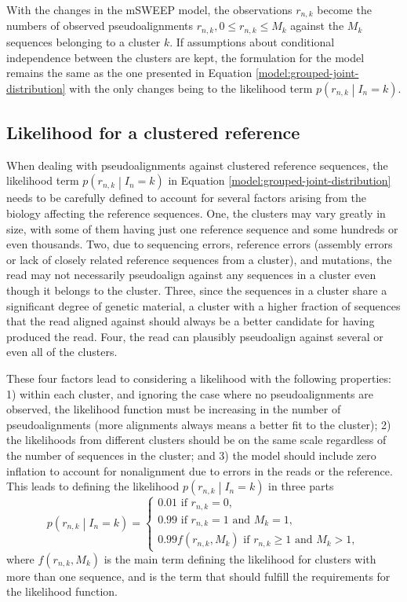\documentclass[officiallayout]{tktla}
\begin{document}
With the changes in the mSWEEP model, the observations $r_{n, k}$
become the numbers of observed pseudoalignments $r_{n, k}, 0 \leq
r_{n, k} \leq M_{k}$ against the $M_{k}$ sequences belonging to a
cluster $k$. If assumptions about conditional independence between the clusters
are kept, the formulation for the model remains the same as the one
presented in Equation \eqref{model:grouped-joint-distribution} with the
only changes being to the likelihood term $p\left(r_{n, k} \middle|
I_{n} = k\right)$.


\subsection{Likelihood for a clustered reference}

When dealing with pseudoalignments against clustered reference
sequences, the likelihood term $p\left(r_{n, k} \middle| I_{n} =
k\right)$ in Equation \eqref{model:grouped-joint-distribution} needs to
be carefully defined to account for several factors arising from the
biology affecting the reference sequences. One, the clusters may vary
greatly in size, with some of them having just one reference sequence
and some hundreds or even thousands. Two, due to sequencing errors,
reference errors (assembly errors or lack of closely related reference
sequences from a cluster), and mutations, the read may not necessarily
pseudoalign against any sequences in a cluster even though it belongs
to the cluster. Three, since the sequences in a cluster share a
significant degree of genetic material, a cluster with a higher
fraction of sequences that the read aligned against should always be a
better candidate for having produced the read. Four, the read can
plausibly pseudoalign against several or even all of the clusters.

These four factors lead to considering a likelihood with the following
properties: 1) within each cluster, and ignoring the case where no
pseudoalignments are observed, the likelihood function must be
increasing in the number of pseudoalignments (more alignments always
means a better fit to the cluster); 2) the likelihoods from different
clusters should be on the same scale regardless of the number of
sequences in the cluster; and 3) the model should include zero
inflation to account for nonalignment due to errors in the reads or
the reference. This leads to defining the likelihood $p\left(r_{n,
  k} \middle| I_{n} = k\right)$ in three parts
\begin{equation}
  \label{likelihood:without-normalization}
  p\left(r_{n, k} \middle| I_{n} = k\right) =
  \begin{cases}
    0.01\text{ if } r_{n, k} = 0, \\
    0.99\text{ if } r_{n, k} = 1 \text{ and } M_{k} = 1, \\
    0.99f\left(r_{n, k}, M_{k}\right)\text{ if } r_{n, k} \geq 1\text{ and } M_{k} > 1,
  \end{cases}
\end{equation}
where $f\left(r_{n, k}, M_{k}\right)$ is the main term defining the
likelihood for clusters with more than one sequence, and is the term
that should fulfill the requirements for the likelihood function.
\end{document}
